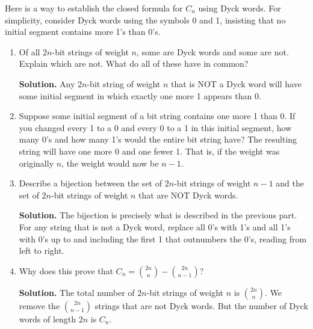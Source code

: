 \documentclass{book}
\begin{document}
\setcounter{project}{186}
\addtocounter{project}{-1}
\begin{activity}[]\label{activity-179}
\hypertarget{p-1102}{}%
Here is a way to establish the closed formula for \(C_n\) using Dyck words.  For simplicity, consider Dyck words using the symbols 0 and 1, insisting that no initial segment contains more 1's than 0's.%
\begin{enumerate}[font=\bfseries,label=(\alph*),ref=\alph*]
\item\label{task-200} \hypertarget{p-1103}{}%
Of all \(2n\)-bit strings of weight \(n\), some are Dyck words and some are not.  Explain which are not.  What do all of these have in common?%
\par\smallskip%
\noindent\textbf{Solution.}\hypertarget{solution-118}{}\quad%
\hypertarget{p-1104}{}%
Any \(2n\)-bit string of weight \(n\) that is NOT a Dyck word will have some initial segment in which exactly one more 1 appears than 0.%
\item\label{task-201} \hypertarget{p-1105}{}%
Suppose some initial segment of a bit string contains one more 1 than 0.  If you changed every 1 to a 0 and every 0 to a 1 in this initial segment, how many 0's and how many 1's would the entire bit string have?%
\hypertarget{p-1106}{}%
The resulting string will have one more 0 and one fewer 1.  That is, if the weight was originally \(n\), the weight would now be \(n-1\).%
\item\label{task-202} \hypertarget{p-1107}{}%
Describe a bijection between the set of \(2n\)-bit strings of weight \(n-1\) and the set of \(2n\)-bit strings of weight \(n\) that are NOT Dyck words.%
\par\smallskip%
\noindent\textbf{Solution.}\hypertarget{solution-119}{}\quad%
\hypertarget{p-1108}{}%
The bijection is precisely what is described in the previous part.  For any string that is not a Dyck word, replace all 0's with 1's and all 1's with 0's up to and including the first 1 that outnumbers the 0's, reading from left to right.%
\item\label{task-203} \hypertarget{p-1109}{}%
Why does this prove that \(C_n = \binom{2n}{n} - \binom{2n}{n-1}\)?%
\par\smallskip%
\noindent\textbf{Solution.}\hypertarget{solution-120}{}\quad%
\hypertarget{p-1110}{}%
The total number of \(2n\)-bit strings of weight \(n\) is \(\binom{2n}{n}\).  We remove the \(\binom{2n}{n-1}\) strings that are not Dyck words.  But the number of Dyck words of length \(2n\) is \(C_n\).%
\end{enumerate}
\end{activity}
\end{document}
